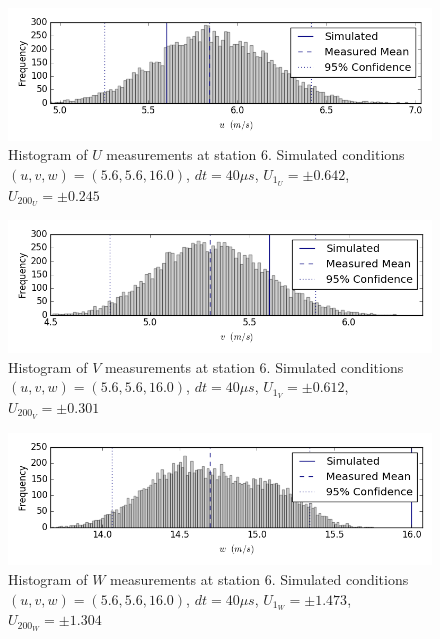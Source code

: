 \begin{figure}[H]
\centering
\includegraphics[width=6in]{figs/Ely_May28th06002/uncertainty_Ely_May28th06002_U}
\caption{Histogram of $U$ measurements at station 6. Simulated conditions $(u,v,w)=(5.6, 5.6, 16.0)$, $dt=40 \mu s$, $U_1_U=\pm 0.642$, $U_200_U=\pm 0.245$}
\label{fig:uncertainty_Ely_May28th06002_U}
\end{figure}


\begin{figure}[H]
\centering
\includegraphics[width=6in]{figs/Ely_May28th06002/uncertainty_Ely_May28th06002_V}
\caption{Histogram of $V$ measurements at station 6. Simulated conditions $(u,v,w)=(5.6, 5.6, 16.0)$, $dt=40 \mu s$, $U_1_V=\pm 0.612$, $U_200_V=\pm 0.301$}
\label{fig:uncertainty_Ely_May28th06002_V}
\end{figure}


\begin{figure}[H]
\centering
\includegraphics[width=6in]{figs/Ely_May28th06002/uncertainty_Ely_May28th06002_W}
\caption{Histogram of $W$ measurements at station 6. Simulated conditions $(u,v,w)=(5.6, 5.6, 16.0)$, $dt=40 \mu s$, $U_1_W=\pm 1.473$, $U_200_W=\pm 1.304$}
\label{fig:uncertainty_Ely_May28th06002_W}
\end{figure}


